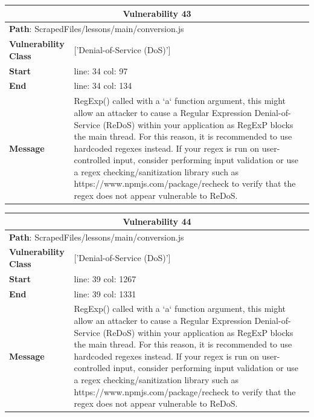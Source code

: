 \documentclass[12pt]{article}
\begin{document}
\vspace{0.7cm}
\FloatBarrier
\begin{table}[!h]
\centering
\renewcommand{\arraystretch}{1.3}
\begin{tabular}{|l|p{10cm}|}
\hline
\multicolumn{2}{|c|}{\textbf{Vulnerability 43}} \\
\hline
\multicolumn{2}{|l|}{\textbf{Path}: ScrapedFiles/lessons/main/conversion.js} \\
\hline
\textbf{Vulnerability Class} & ['Denial-of-Service (DoS)'] \\
\hline
\textbf{Start} & line: 34 \quad col: 97 \\
\hline
\textbf{End} & line: 34 \quad col: 134 \\
\hline
\textbf{Message} & RegExp() called with a `a` function argument, this might allow an attacker to cause a Regular Expression Denial-of-Service (ReDoS) within your application as RegExP blocks the main thread. For this reason, it is recommended to use hardcoded regexes instead. If your regex is run on user-controlled input, consider performing input validation or use a regex checking/sanitization library such as https://www.npmjs.com/package/recheck to verify that the regex does not appear vulnerable to ReDoS. \\
\hline
\end{tabular}
\end{table}
\vspace{0.7cm}
\FloatBarrier
\begin{table}[!h]
\centering
\renewcommand{\arraystretch}{1.3}
\begin{tabular}{|l|p{10cm}|}
\hline
\multicolumn{2}{|c|}{\textbf{Vulnerability 44}} \\
\hline
\multicolumn{2}{|l|}{\textbf{Path}: ScrapedFiles/lessons/main/conversion.js} \\
\hline
\textbf{Vulnerability Class} & ['Denial-of-Service (DoS)'] \\
\hline
\textbf{Start} & line: 39 \quad col: 1267 \\
\hline
\textbf{End} & line: 39 \quad col: 1331 \\
\hline
\textbf{Message} & RegExp() called with a `a` function argument, this might allow an attacker to cause a Regular Expression Denial-of-Service (ReDoS) within your application as RegExP blocks the main thread. For this reason, it is recommended to use hardcoded regexes instead. If your regex is run on user-controlled input, consider performing input validation or use a regex checking/sanitization library such as https://www.npmjs.com/package/recheck to verify that the regex does not appear vulnerable to ReDoS. \\
\hline
\end{tabular}
\end{table}
\end{document}
